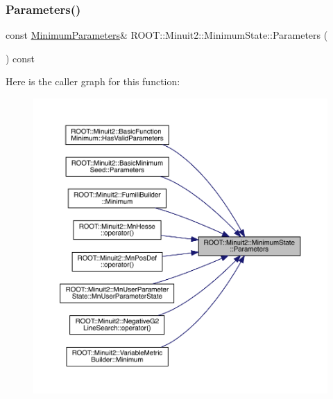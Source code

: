 \subsubsection{\texorpdfstring{Parameters()}{Parameters()}\hspace{0.1cm}{\footnotesize\ttfamily [2/3]}}
{\footnotesize\ttfamily const \mbox{\hyperlink{classROOT_1_1Minuit2_1_1MinimumParameters}{Minimum\+Parameters}}\& R\+O\+O\+T\+::\+Minuit2\+::\+Minimum\+State\+::\+Parameters (\begin{DoxyParamCaption}{ }\end{DoxyParamCaption}) const\hspace{0.3cm}{\ttfamily [inline]}}

Here is the caller graph for this function\+:
\nopagebreak
\begin{figure}[H]
\begin{center}
\leavevmode
\includegraphics[width=350pt]{db/dcd/classROOT_1_1Minuit2_1_1MinimumState_aa81bb59c8eb8c262ef2487ca1b025481_icgraph}
\end{center}
\end{figure}
\mbox{\label{classROOT_1_1Minuit2_1_1MinimumState_aa81bb59c8eb8c262ef2487ca1b025481}} 

